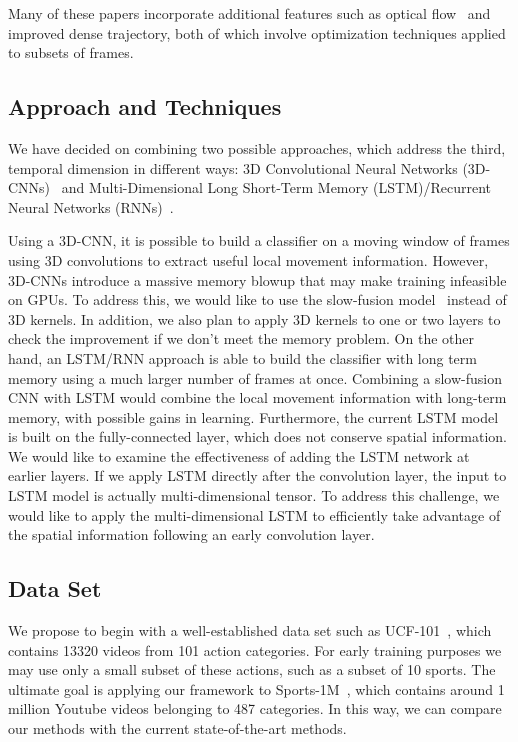 Many of these papers incorporate additional features such as optical flow~\cite{brox} and improved dense trajectory, both of which involve optimization techniques applied to subsets of frames. 
\subsection*{Approach and Techniques}
We have decided on combining two possible approaches, which address
the third, temporal dimension in different ways: 3D Convolutional Neural
Networks (3D-CNNs)~\cite{stf,cnnvid} and Multi-Dimensional Long
Short-Term Memory (LSTM)/Recurrent Neural Networks (RNNs)~\cite{ltrcn}. 

Using a 3D-CNN, it is possible to build a classifier on a moving window
of frames using 3D convolutions to extract useful local movement information. However, 3D-CNNs introduce a massive memory blowup that may make training infeasible on GPUs.
To address this, we would like to use the slow-fusion model~\cite{cnnvid} instead of 3D kernels. In addition, we also plan to apply 3D kernels to one or two layers to check the improvement if we don't meet the memory problem. On the other hand, an LSTM/RNN approach is able to build the classifier with long term memory using a much larger number of frames at once. Combining a slow-fusion CNN with LSTM would combine the local movement information with long-term memory, with possible gains in learning.
Furthermore, the current LSTM model is built on the fully-connected
layer, which does not conserve spatial information. We would like to examine the 
effectiveness of adding the LSTM network at earlier layers.
If we apply LSTM directly after the convolution layer,
the input to LSTM model is actually multi-dimensional tensor. To address
this challenge, we would like to apply the multi-dimensional LSTM
\cite{byeon2015scene} to efficiently take advantage of the spatial
information following an early convolution layer. 

\subsection*{Data Set}
We propose to begin with a well-established data set such as UCF-101~\cite{ucf101}, which contains 13320 videos from 101 action categories. For early training purposes we may use only a small subset of these actions, such as a subset of 10 sports. The ultimate goal is applying our framework to Sports-1M~\cite{cnnvid}, which contains around 1 million Youtube videos belonging to 487 categories. In this way, we can compare our methods with the current state-of-the-art methods.

